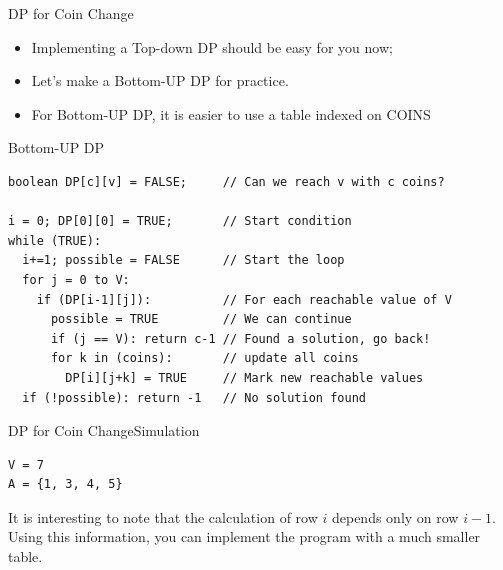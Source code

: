 \begin{frame}[fragile]{DP for Coin Change}
  \begin{itemize}
    \item Implementing a Top-down DP should be easy for you now;
    \item Let's make a Bottom-UP DP for practice.
    \item For Bottom-UP DP, it is easier to use a table indexed on COINS
  \end{itemize}

\begin{block}{Bottom-UP DP}
  {\smaller
\begin{verbatim}
boolean DP[c][v] = FALSE;     // Can we reach v with c coins?

i = 0; DP[0][0] = TRUE;       // Start condition
while (TRUE):
  i+=1; possible = FALSE      // Start the loop
  for j = 0 to V:
    if (DP[i-1][j]):          // For each reachable value of V
      possible = TRUE         // We can continue
      if (j == V): return c-1 // Found a solution, go back!
      for k in (coins):       // update all coins
        DP[i][j+k] = TRUE     // Mark new reachable values
  if (!possible): return -1   // No solution found
\end{verbatim}}
\end{block}
\end{frame}

\begin{frame}[fragile]{DP for Coin Change}{Simulation}
\begin{verbatim}
V = 7
A = {1, 3, 4, 5}
\end{verbatim}

\begin{center}
\bigskip
\end{center}
\bigskip

It is interesting to note that the calculation of row $i$ depends only on row $i-1$. Using this information, you can implement the program with a much smaller table.

\end{frame}


